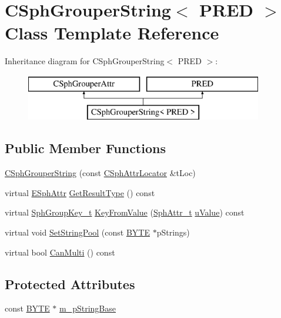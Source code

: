 \hypertarget{classCSphGrouperString}{\section{C\-Sph\-Grouper\-String$<$ P\-R\-E\-D $>$ Class Template Reference}
\label{classCSphGrouperString}
}
Inheritance diagram for C\-Sph\-Grouper\-String$<$ P\-R\-E\-D $>$\-:\begin{figure}[H]
\begin{center}
\leavevmode
\includegraphics[height=2.000000cm]{classCSphGrouperString}
\end{center}
\end{figure}
\subsection*{Public Member Functions}
\begin{DoxyCompactItemize}
\item 
\hyperlink{classCSphGrouperString_a63260f2774f985fcb4390708ccc510ec}{C\-Sph\-Grouper\-String} (const \hyperlink{structCSphAttrLocator}{C\-Sph\-Attr\-Locator} \&t\-Loc)
\item 
virtual \hyperlink{sphinxexpr_8h_aa883df0db2e4468a107fdd2d2ae625a3}{E\-Sph\-Attr} \hyperlink{classCSphGrouperString_a118e6a7d47df214c6b3450c66d1f79c3}{Get\-Result\-Type} () const 
\item 
virtual \hyperlink{sphinxsort_8cpp_ab18dbc744a7e1518a776845191f194c8}{Sph\-Group\-Key\-\_\-t} \hyperlink{classCSphGrouperString_ae0b1d65db73d44e20d5f1f7c71a9d98c}{Key\-From\-Value} (\hyperlink{sphinx_8h_a7c122d91b0b52a0214ba176636bb1561}{Sph\-Attr\-\_\-t} \hyperlink{sphinxsort_8cpp_a7906295a5b0753053dbc737117036d06}{u\-Value}) const 
\item 
virtual void \hyperlink{classCSphGrouperString_a73eef6b26c309cbce7aafc5193857b6e}{Set\-String\-Pool} (const \hyperlink{sphinxstd_8h_a4ae1dab0fb4b072a66584546209e7d58}{B\-Y\-T\-E} $\ast$p\-Strings)
\item 
virtual bool \hyperlink{classCSphGrouperString_a40cd5207825e812b0a414ce53c191244}{Can\-Multi} () const 
\end{DoxyCompactItemize}
\subsection*{Protected Attributes}
\begin{DoxyCompactItemize}
\item 
const \hyperlink{sphinxstd_8h_a4ae1dab0fb4b072a66584546209e7d58}{B\-Y\-T\-E} $\ast$ \hyperlink{classCSphGrouperString_a520ee4937b616d61b5dd2ae19f4a9180}{m\-\_\-p\-String\-Base}
\end{DoxyCompactItemize}


